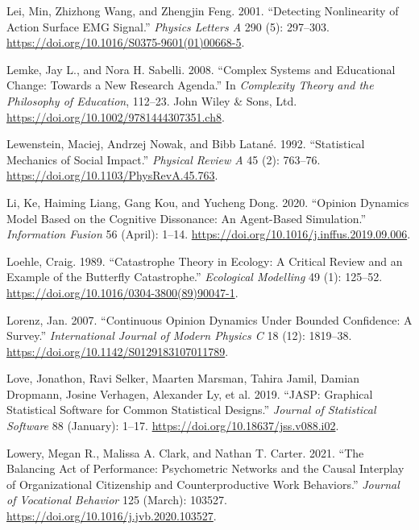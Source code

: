 \documentclass[
  a4paper,
  DIV=11,
  numbers=noendperiod,
  oneside]{scrreprt}
\newlength{\cslhangindent}
\newlength{\cslentryspacingunit} %
\newenvironment{CSLReferences}[2] %
 {%
  \setlength{\parindent}{0pt}
  \ifodd #1
  \let\oldpar\par
  \def\par{\hangindent=\cslhangindent\oldpar}
  \fi
  \setlength{\parskip}{#2\cslentryspacingunit}
 }%
 {}
\begin{document}
\begin{CSLReferences}{1}{0}
\leavevmode{}%
Lei, Min, Zhizhong Wang, and Zhengjin Feng. 2001. {``Detecting
Nonlinearity of Action Surface {EMG} Signal.''} \emph{Physics Letters A}
290 (5): 297--303. \url{https://doi.org/10.1016/S0375-9601(01)00668-5}.

\leavevmode{}%
Lemke, Jay L., and Nora H. Sabelli. 2008. {``Complex {Systems} and
{Educational Change}: {Towards} a {New Research Agenda}.''} In
\emph{Complexity {Theory} and the {Philosophy} of {Education}}, 112--23.
{John Wiley \& Sons, Ltd}.
\url{https://doi.org/10.1002/9781444307351.ch8}.

\leavevmode{}%
Lewenstein, Maciej, Andrzej Nowak, and Bibb Latané. 1992. {``Statistical
Mechanics of Social Impact.''} \emph{Physical Review A} 45 (2): 763--76.
\url{https://doi.org/10.1103/PhysRevA.45.763}.

\leavevmode{}%
Li, Ke, Haiming Liang, Gang Kou, and Yucheng Dong. 2020. {``Opinion
Dynamics Model Based on the Cognitive Dissonance: {An} Agent-Based
Simulation.''} \emph{Information Fusion} 56 (April): 1--14.
\url{https://doi.org/10.1016/j.inffus.2019.09.006}.

\leavevmode{}%
Loehle, Craig. 1989. {``Catastrophe Theory in Ecology: A Critical Review
and an Example of the Butterfly Catastrophe.''} \emph{Ecological
Modelling} 49 (1): 125--52.
\url{https://doi.org/10.1016/0304-3800(89)90047-1}.

\leavevmode{}%
Lorenz, Jan. 2007. {``Continuous Opinion Dynamics Under Bounded
Confidence: A Survey.''} \emph{International Journal of Modern Physics
C} 18 (12): 1819--38. \url{https://doi.org/10.1142/S0129183107011789}.

\leavevmode{}%
Love, Jonathon, Ravi Selker, Maarten Marsman, Tahira Jamil, Damian
Dropmann, Josine Verhagen, Alexander Ly, et al. 2019. {``{JASP}:
{Graphical Statistical Software} for {Common Statistical Designs}.''}
\emph{Journal of Statistical Software} 88 (January): 1--17.
\url{https://doi.org/10.18637/jss.v088.i02}.

\leavevmode{}%
Lowery, Megan R., Malissa A. Clark, and Nathan T. Carter. 2021. {``The
Balancing Act of Performance: {Psychometric} Networks and the Causal
Interplay of Organizational Citizenship and Counterproductive Work
Behaviors.''} \emph{Journal of Vocational Behavior} 125 (March): 103527.
\url{https://doi.org/10.1016/j.jvb.2020.103527}.


\end{CSLReferences}
\end{document}
